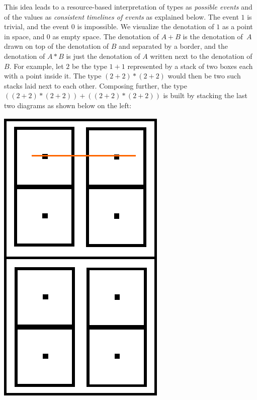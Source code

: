 \documentclass{article}
\begin{document}
This idea leads to a resource-based interpretation of types as
\emph{possible events} and of the values as \emph{consistent timelines
  of events} as explained below. The event $1$ is trivial, and the
event $0$ is impossible.  We visualize the denotation of $1$ as a
point in space, and $0$ as empty space. The denotation of $A + B$ is
the denotation of~$A$ drawn on top of the denotation of $B$ and
separated by a border, and the denotation of $A * B$ is just the
denotation of $A$ written next to the denotation of $B$.  For example,
let $2$ be the type $1 + 1$ represented by a stack of two boxes each
with a point inside it. The type $(2 + 2) * (2 + 2)$ would then be two
such stacks laid next to each other. Composing further, the type
$((2 + 2) * (2 + 2)) + ((2 + 2) * (2 + 2))$ is built by stacking the
last two diagrams as shown below on the left:
\begin{center}
\hfill 
\includegraphics[scale=0.3]{images/tall-tl-1}
~

\end{center}
\end{document}

